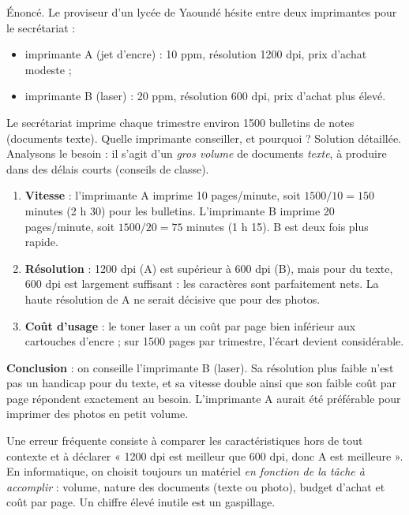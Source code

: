 \documentclass[11pt]{article}
\begin{document}
\begin{exoresolu}
Énoncé. Le proviseur d'un lycée de Yaoundé hésite entre deux imprimantes pour le secrétariat :
\begin{itemize}
\item imprimante A (jet d'encre) : 10 ppm, résolution 1200 dpi, prix d'achat modeste ;
\item imprimante B (laser) : 20 ppm, résolution 600 dpi, prix d'achat plus élevé.
\end{itemize}
Le secrétariat imprime chaque trimestre environ 1500 bulletins de notes (documents texte). Quelle imprimante conseiller, et pourquoi ?
\tcblower
Solution détaillée. Analysons le besoin : il s'agit d'un \emph{gros volume} de documents \emph{texte}, à produire dans des délais courts (conseils de classe).
\begin{enumerate}
\item \textbf{Vitesse} : l'imprimante A imprime 10 pages/minute, soit $1500 / 10 = 150$ minutes (2 h 30) pour les bulletins. L'imprimante B imprime 20 pages/minute, soit $1500 / 20 = 75$ minutes (1 h 15). B est deux fois plus rapide.
\item \textbf{Résolution} : 1200 dpi (A) est supérieur à 600 dpi (B), mais pour du texte, 600 dpi est largement suffisant : les caractères sont parfaitement nets. La haute résolution de A ne serait décisive que pour des photos.
\item \textbf{Coût d'usage} : le toner laser a un coût par page bien inférieur aux cartouches d'encre ; sur 1500 pages par trimestre, l'écart devient considérable.
\end{enumerate}
\textbf{Conclusion} : on conseille l'imprimante B (laser). Sa résolution plus faible n'est pas un handicap pour du texte, et sa vitesse double ainsi que son faible coût par page répondent exactement au besoin. L'imprimante A aurait été préférable pour imprimer des photos en petit volume.
\end{exoresolu}

\begin{attention}
Une erreur fréquente consiste à comparer les caractéristiques hors de tout contexte et à déclarer « 1200 dpi est meilleur que 600 dpi, donc A est meilleure ». En informatique, on choisit toujours un matériel \emph{en fonction de la tâche à accomplir} : volume, nature des documents (texte ou photo), budget d'achat et coût par page. Un chiffre élevé inutile est un gaspillage.
\end{attention}
\end{document}
